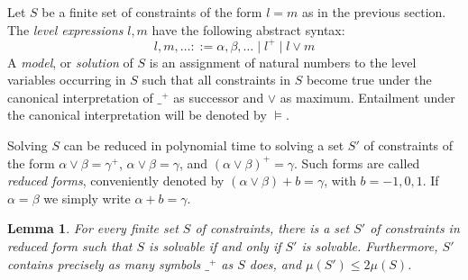\documentclass[11pt,a4paper]{article}
\newtheorem{lemma}{Lemma}[theorem]
\begin{document}
Let $S$ be a finite set of constraints of the form $l=m$ as in the previous section.
The \emph{level expressions} $l,m$ have the following abstract syntax:
\[
l,m,\ldots ::= {\alpha,\beta,\ldots} \mid {l^+} \mid {l\vee m}
\]
A \emph{model}, or \emph{solution} of $S$ is an assignment of natural numbers to
the level variables occurring in $S$ such that all constraints in $S$ become true
under the canonical interpretation of $\_^+$ as successor and $\vee$ as maximum.
Entailment under the canonical interpretation will be denoted by $\models$.

Solving $S$ can be reduced in polynomial time to solving a set $S'$ of
constraints of the form $\alpha\vee\beta = \gamma^+$, $\alpha\vee\beta = \gamma$,
and $(\alpha\vee\beta)^+ = \gamma$. Such forms are called \emph{reduced forms},
conveniently denoted by $(\alpha\vee\beta)+b = \gamma$, with $b=-1,0,1$.
If $\alpha=\beta$ we simply write $\alpha+b = \gamma$.

\begin{lemma}\label{lem:reduced-form}
For every finite set $S$ of constraints, there is a set $S'$ of
constraints in reduced form such that $S$ is solvable if and only if $S'$
is solvable. Furthermore, $S'$ contains precisely as many symbols $\_^+$ as $S$ does,
and $\mu(S')\leq 2\mu(S)$.
\end{lemma}
\end{document}

